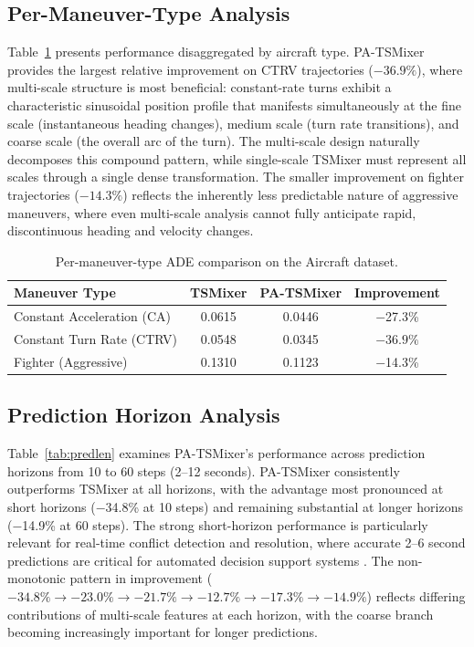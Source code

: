 \documentclass[letterpaper,journal]{IEEEtran}
\begin{document}
\subsection{Per-Maneuver-Type Analysis}
Table~\ref{tab:maneuver} presents performance disaggregated by aircraft type.
PA-TSMixer provides the largest relative improvement on CTRV trajectories
($-36.9\%$), where multi-scale structure is most beneficial: constant-rate turns
exhibit a characteristic sinusoidal position profile that manifests simultaneously
at the fine scale (instantaneous heading changes), medium scale (turn rate
transitions), and coarse scale (the overall arc of the turn). The multi-scale
design naturally decomposes this compound pattern, while single-scale TSMixer
must represent all scales through a single dense transformation. The smaller
improvement on fighter trajectories ($-14.3\%$) reflects the inherently less
predictable nature of aggressive maneuvers, where even multi-scale analysis
cannot fully anticipate rapid, discontinuous heading and velocity changes.

\begin{table}[!t]
\caption{Per-maneuver-type ADE comparison on the Aircraft dataset.\label{tab:maneuver}}
\centering
\footnotesize
\setlength{\tabcolsep}{3pt}
\begin{tabular}{lccc}
\toprule
Maneuver Type & TSMixer & PA-TSMixer & Improvement \\
\midrule
Constant Acceleration (CA) & 0.0615 & 0.0446 & $-$27.3\% \\
Constant Turn Rate (CTRV)  & 0.0548 & 0.0345 & $\mathbf{-36.9\%}$ \\
Fighter (Aggressive)       & 0.1310 & 0.1123 & $-$14.3\% \\
\bottomrule
\end{tabular}
\end{table}

\subsection{Prediction Horizon Analysis}
Table~\ref{tab:predlen} examines PA-TSMixer's performance across prediction horizons
from 10 to 60 steps (2--12 seconds). PA-TSMixer consistently outperforms TSMixer
at all horizons, with the advantage most pronounced at short horizons ($-$34.8\%
at 10 steps) and remaining substantial at longer horizons ($-$14.9\% at 60 steps).
The strong short-horizon performance is particularly relevant for real-time
conflict detection and resolution, where accurate 2--6 second predictions are
critical for automated decision support systems \cite{Schuster2024}. The
non-monotonic pattern in improvement ($-34.8\% \rightarrow -23.0\% \rightarrow
-21.7\% \rightarrow -12.7\% \rightarrow -17.3\% \rightarrow -14.9\%$) reflects
differing contributions of multi-scale features at each horizon, with the coarse
branch becoming increasingly important for longer predictions.
\end{document}
